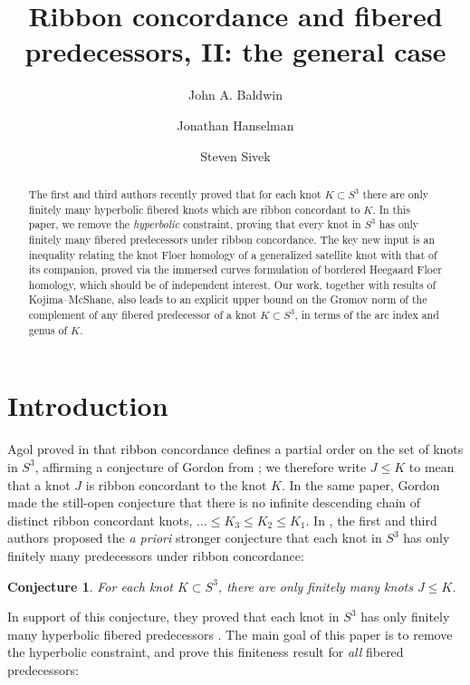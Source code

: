 \documentclass[11pt]{amsart}
\title{Ribbon concordance and fibered predecessors, II: the general case}
\author[John A. Baldwin]{John A. Baldwin}
\author[Jonathan Hanselman]{Jonathan Hanselman}
\author[Steven Sivek]{Steven Sivek}
\newtheorem {conjecture}[theorem]{Conjecture}
\numberwithin{equation}{section}
\numberwithin{theorem}{section}
\theoremstyle{definition}
\begin{document}
\begin{abstract}
The first and third authors recently proved that for each  knot $K\subset S^3$ there are only finitely many hyperbolic fibered knots which are ribbon concordant to $K$. In this paper, we remove the \emph{hyperbolic} constraint, proving that every knot in $S^3$ has only finitely many fibered predecessors under ribbon concordance. The key new input is an inequality relating the knot Floer homology of a generalized satellite knot with that of its companion, proved via the immersed curves formulation of bordered Heegaard Floer homology, which should be  of independent interest. Our work, together with results of Kojima--McShane, also leads to an explicit upper bound on the Gromov norm of the complement of any fibered predecessor of a knot $K \subset S^3$, in terms of the arc index and genus of $K$.
\end{abstract}

\maketitle

\section{Introduction}
\label{sec:intro}

Agol proved in \cite{agol-ribbon} that ribbon concordance defines a partial order on the set of knots in $S^3$, affirming a conjecture of Gordon from \cite{gordon-ribbon}; we therefore write $J\leq K$ to mean that a knot $J$ is ribbon concordant to the knot $K$. In the same paper, Gordon made the still-open conjecture  that there is no infinite descending chain of distinct ribbon concordant knots, $\dots \leq K_3 \leq K_2\leq K_1$. In \cite{bs-ribbon}, the first and third authors proposed the \emph{a priori} stronger conjecture that each knot in $S^3$ has only finitely many predecessors under ribbon concordance:

\begin{conjecture}
\label{conj:pred}
For each knot $K\subset S^3$, there are only finitely many knots $J\leq K$.
\end{conjecture}

In support of this conjecture, they proved that each knot in $S^3$ has only finitely many hyperbolic fibered predecessors \cite[Theorem 1.2]{bs-ribbon}. The main goal of this paper is to remove the hyperbolic constraint, and prove this finiteness result for \emph{all} fibered predecessors:
\end{document}
